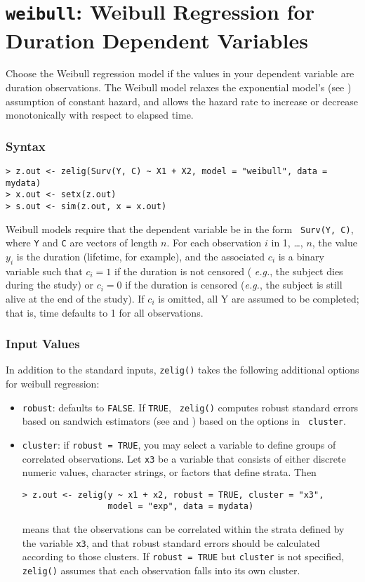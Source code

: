 \section{{\tt weibull}: Weibull Regression for Duration
Dependent Variables}\label{weibull}

Choose the Weibull regression model if the values in your dependent
variable are duration observations.  The Weibull model relaxes the
exponential model's (see ) assumption of constant hazard,
and allows the hazard rate to increase or decrease monotonically with
respect to elapsed time.

\subsubsection{Syntax}

\begin{verbatim}
> z.out <- zelig(Surv(Y, C) ~ X1 + X2, model = "weibull", data = mydata)
> x.out <- setx(z.out)
> s.out <- sim(z.out, x = x.out)
\end{verbatim}
Weibull models require that the dependent variable be in the form {\tt
  Surv(Y, C)}, where {\tt Y} and {\tt C} are vectors of length $n$.
For each observation $i$ in 1, \dots, $n$, the value $y_i$ is the
duration (lifetime, for example), and the associated $c_i$ is a binary
variable such that $c_i = 1$ if the duration is not censored ({\it
  e.g.}, the subject dies during the study) or $c_i = 0$ if the
duration is censored ({\it e.g.}, the subject is still alive at the
end of the study).  If $c_i$ is omitted, all Y are assumed to be
completed; that is, time defaults to 1 for all observations.

\subsubsection{Input Values} 

In addition to the standard inputs, {\tt zelig()} takes the following
additional options for weibull regression:  
\begin{itemize}
\item {\tt robust}: defaults to {\tt FALSE}.  If {\tt TRUE}, {\tt
zelig()} computes robust standard errors based on sandwich estimators
(see \cite{Huber81} and \cite{White80}) based on the options in {\tt
cluster}.
\item {\tt cluster}:  if {\tt robust = TRUE}, you may select a
variable to define groups of correlated observations.  Let {\tt x3} be
a variable that consists of either discrete numeric values, character
strings, or factors that define strata.  Then
\begin{verbatim}
> z.out <- zelig(y ~ x1 + x2, robust = TRUE, cluster = "x3", 
                 model = "exp", data = mydata)
\end{verbatim}
means that the observations can be correlated within the strata defined by
the variable {\tt x3}, and that robust standard errors should be
calculated according to those clusters.  If {\tt robust = TRUE} but
{\tt cluster} is not specified, {\tt zelig()} assumes that each
observation falls into its own cluster.  
\end{itemize}  

